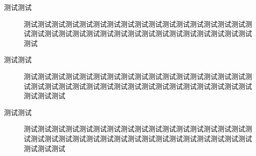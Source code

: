 \documentclass{njuthesis}
\begin{document}
\begin{description}
    \item[测试测试] 测试测试测试测试测试测试测试测试测试测试测试测试测试测试测试测试测试测试测试测试测试测试测试测试测试测试测试测试测试测试测试测试测试测试
    \item[测试测试] 测试测试测试测试测试测试测试测试测试测试测试测试测试测试测试测试测试测试测试测试测试测试测试测试测试测试测试测试测试测试测试测试测试测试测试测试
    \item[测试测试] 测试测试测试测试测试测试测试测试测试测试测试测试测试测试测试测试测试测试测试测试测试测试测试测试测试测试测试测试测试测试测试测试测试测试测试测试
\end{description}






\printbibliography



\appendix



\end{document}
